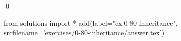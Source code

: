 
\begin{ex}
  \label{ex:0-80-inheritance}
  
  \qed
\end{ex}
\begin{python0}
from solutions import *
add(label="ex:0-80-inheritance",
    srcfilename='exercises/0-80-inheritance/answer.tex')
\end{python0}
